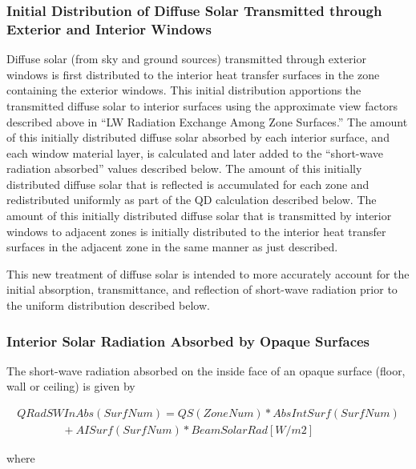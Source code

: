 \subsubsection{Initial Distribution of Diffuse Solar Transmitted through Exterior and Interior Windows}\label{initial-distribution-of-diffuse-solar-transmitted-through-exterior-and-interior-windows}

Diffuse solar (from sky and ground sources) transmitted through exterior windows is first distributed to the interior heat transfer surfaces in the zone containing the exterior windows. This initial distribution apportions the transmitted diffuse solar to interior surfaces using the approximate view factors described above in ``LW Radiation Exchange Among Zone Surfaces.'' The amount of this initially distributed diffuse solar absorbed by each interior surface, and each window material layer, is calculated and later added to the ``short-wave radiation absorbed'' values described below. The amount of this initially distributed diffuse solar that is reflected is accumulated for each zone and redistributed uniformly as part of the QD calculation described below. The amount of this initially distributed diffuse solar that is transmitted by interior windows to adjacent zones is initially distributed to the interior heat transfer surfaces in the adjacent zone in the same manner as just described.

This new treatment of diffuse solar is intended to more accurately account for the initial absorption, transmittance, and reflection of short-wave radiation prior to the uniform distribution described below.

\subsubsection{Interior Solar Radiation Absorbed by Opaque Surfaces}\label{interior-solar-radiation-absorbed-by-opaque-surfaces}

The short-wave radiation absorbed on the inside face of an opaque surface (floor, wall or ceiling) is given by

\begin{equation}
\begin{array}{l}
QRadSWInAbs(SurfNum) = QS(ZoneNum)*AbsIntSurf(SurfNum) \\
\quad \quad \quad \quad+ AISurf(SurfNum)*BeamSolarRad [W/m2]
\end{array}
\end{equation}

where

